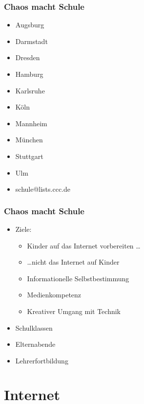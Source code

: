 \documentclass[14pt,handout]{beamer}
\begin{document}
\begin{frame}
    \frametitle{Chaos macht Schule}
    \begin{itemize}
        \item <2-> Augsburg
        \item <2-> Darmstadt
        \item <2-> Dresden
        \item <2-> Hamburg
        \item <2-> Karlsruhe
        \item <2-> Köln
        \item <2-> Mannheim
        \item <2-> München
        \item <2-> Stuttgart
        \item <2-> Ulm
        \item <3-> schule@lists.ccc.de
    \end{itemize}
\end{frame}

            
\begin{frame}
    \frametitle{Chaos macht Schule}
    \begin{itemize}
        \item<2->Ziele:
            \begin{itemize}
                \item<3-> Kinder auf das Internet vorbereiten \ldots
                \item<4-> \ldots nicht das Internet auf Kinder
                \item<5-> Informationelle Selbstbestimmung
                \item<6-> Medienkompetenz
                \item<7-> Kreativer Umgang mit Technik
            \end{itemize}
        \item<8-> Schulklassen
        \item<9-> Elternabende
        \item<10-> Lehrerfortbildung
    \end{itemize}
\end{frame}

\section{Internet}
\end{document}

